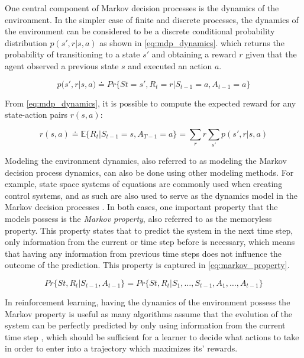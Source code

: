 \documentclass[../report.tex]{subfiles}
\begin{document}
One central component of Markov decision processes is the dynamics of the environment. In the simpler case of finite and discrete processes, the dynamics of the environment can be considered to be a discrete conditional probability distribution $p(s', r|s,a)$ as shown in \autoref{eq:mdp_dynamics}. which returns the probability of transitioning to a state $s'$ and obtaining a reward $r$ given that the agent observed a previous state $s$ and executed an action $a$.

\begin{equation} \label{eq:mdp_dynamics}
    p(s', r|s,a) \doteq Pr\{St=s', R_t=r|S_{t-1}=a,A_{t-1} =a\}
\end{equation}

From \autoref{eq:mdp_dynamics}, it is possible to compute the expected reward for any state-action pairs $r(s,a)$:

\begin{equation}
    r(s,a) \doteq \mathbb{E}\{R_t | S_{t-1}=s, A_{T-1}=a\} = \sum\limits_{r}r\sum\limits_{s'}p(s', r|s,a)
\end{equation}

Modeling the environment dynamics, also referred to as modeling the Markov decision process dynamics, can also be done using other modeling methods. For example, state space systems of equations are commonly used when creating control systems, and as such are also used to serve as the dynamics model in the Markov decision processes \cite{ss_example_1, ss_example_2, ss_example_3}. In both cases, one important property that the models possess is the \textit{Markov property}, also referred to as the memoryless property. This property states that to predict the system in the next time step, only information from the current or time step before is necessary, which means that having any information from previous time steps does not influence the outcome of the prediction. This property is captured in \autoref{eq:markov_property}.

\begin{equation} \label{eq:markov_property}
    Pr\{St, R_t|S_{t-1},A_{t-1}\} = Pr\{St, R_t|S_1, \dots, S_{t-1}, A_1, \dots, A_{t-1}\}
\end{equation}


In reinforcement learning, having the dynamics of the environment possess the Markov property is useful as many algorithms assume that the evolution of the system can be perfectly predicted by only using information from the current time step \cite{markov_property}, which should be sufficient for a learner to decide what actions to take in order to enter into a trajectory which maximizes its' rewards.
\end{document}
